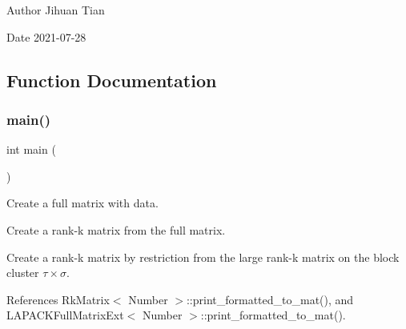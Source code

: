 \begin{DoxyAuthor}{Author}
Jihuan Tian 
\end{DoxyAuthor}
\begin{DoxyDate}{Date}
2021-\/07-\/28 
\end{DoxyDate}


\subsection{Function Documentation}
\mbox{\label{rkmatrix-global-to-rkmatrix_8cc_ae66f6b31b5ad750f1fe042a706a4e3d4}} 
\subsubsection{\texorpdfstring{main()}{main()}}
{\footnotesize\ttfamily int main (\begin{DoxyParamCaption}{ }\end{DoxyParamCaption})}

Create a full matrix with data.

Create a rank-\/k matrix from the full matrix.

Create a rank-\/k matrix by restriction from the large rank-\/k matrix on the block cluster $\tau \times \sigma$.

References Rk\+Matrix$<$ Number $>$\+::print\+\_\+formatted\+\_\+to\+\_\+mat(), and L\+A\+P\+A\+C\+K\+Full\+Matrix\+Ext$<$ Number $>$\+::print\+\_\+formatted\+\_\+to\+\_\+mat().


